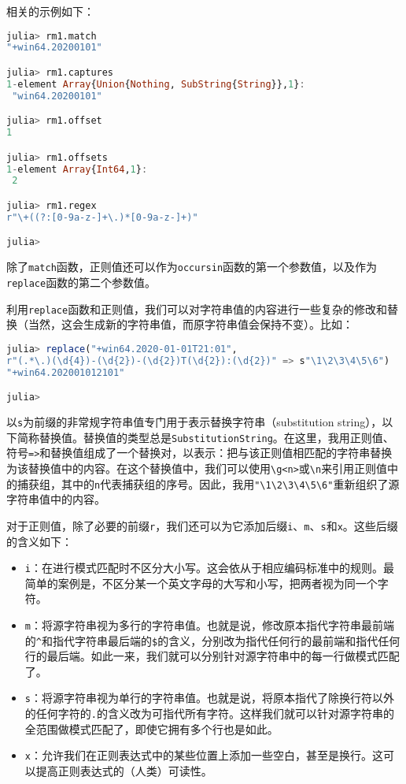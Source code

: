 相关的示例如下：
\begin{lstlisting}[language=julia]
julia> rm1.match
"+win64.20200101"

julia> rm1.captures
1-element Array{Union{Nothing, SubString{String}},1}:
 "win64.20200101"

julia> rm1.offset
1

julia> rm1.offsets
1-element Array{Int64,1}:
 2

julia> rm1.regex
r"\+((?:[0-9a-z-]+\.)*[0-9a-z-]+)"

julia> 
\end{lstlisting}

除了\verb|match|函数，正则值还可以作为\verb|occursin|函数的第一个参数值，以及作为\verb|replace|函数的第二个参数值。

利用\verb|replace|函数和正则值，我们可以对字符串值的内容进行一些复杂的修改和替换（当然，这会生成新的字符串值，而原字符串值会保持不变）。比如：
\begin{lstlisting}[language=julia]
julia> replace("+win64.2020-01-01T21:01", 
r"(.*\.)(\d{4})-(\d{2})-(\d{2})T(\d{2}):(\d{2})" => s"\1\2\3\4\5\6")
"+win64.202001012101"

julia> 
\end{lstlisting}

以\verb|s|为前缀的非常规字符串值专门用于表示替换字符串（substitution string），以下简称替换值。替换值的类型总是\verb|SubstitutionString|。在这里，我用正则值、符号\verb|=>|和替换值组成了一个替换对，以表示：把与该正则值相匹配的字符串替换为该替换值中的内容。在这个替换值中，我们可以使用\verb|\g<n>|或\verb|\n|来引用正则值中的捕获组，其中的\verb|n|代表捕获组的序号。因此，我用\verb|"\1\2\3\4\5\6"|重新组织了源字符串值中的内容。

对于正则值，除了必要的前缀\verb|r|，我们还可以为它添加后缀\verb|i|、\verb|m|、\verb|s|和\verb|x|。这些后缀的含义如下：
\begin{itemize}
\item \verb|i|：在进行模式匹配时不区分大小写。这会依从于相应编码标准中的规则。最简单的案例是，不区分某一个英文字母的大写和小写，把两者视为同一个字符。
\item  \verb|m|：将源字符串视为多行的字符串值。也就是说，修改原本指代字符串最前端的\verb|^|和指代字符串最后端的\verb|$|的含义，分别改为指代任何行的最前端和指代任何行的最后端。如此一来，我们就可以分别针对源字符串中的每一行做模式匹配了。
\item  \verb|s|：将源字符串视为单行的字符串值。也就是说，将原本指代了除换行符以外的任何字符的\verb|.|的含义改为可指代所有字符。这样我们就可以针对源字符串的全范围做模式匹配了，即使它拥有多个行也是如此。
\item  \verb|x|：允许我们在正则表达式中的某些位置上添加一些空白，甚至是换行。这可以提高正则表达式的（人类）可读性。
\end{itemize}

